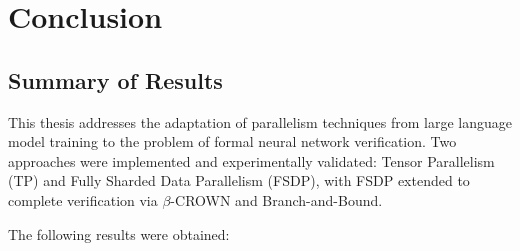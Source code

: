 \section{Conclusion}

\subsection{Summary of Results}

This thesis addresses the adaptation of parallelism techniques from large
language model training to the problem of formal neural network verification.
Two approaches were implemented and experimentally validated: Tensor Parallelism
(TP) and Fully Sharded Data Parallelism (FSDP), with FSDP extended to complete
verification via $\beta$-CROWN and Branch-and-Bound.

The following results were obtained:

